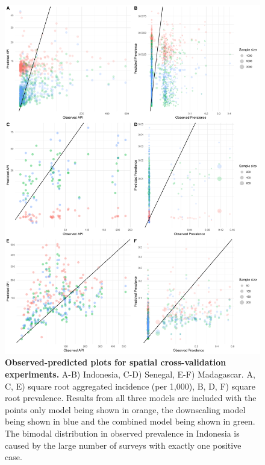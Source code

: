 \documentclass[10pt,letterpaper]{article}
\begin{document}
\begin{figure}
\includegraphics[width = 1.05\textwidth]{figures/spatial_cv_scatter} %
\caption{{\bf Observed-predicted plots for spatial cross-validation experiments.}
A-B) Indonesia, C-D) Senegal, E-F) Madagascar. A, C, E) square root aggregated incidence (per 1,000), B, D, F) square root prevalence.
Results from all three models are included with the points only model being shown in orange, the downscaling model being shown in blue and the combined model being shown in green.
The bimodal distribution in observed prevalence in Indonesia is caused by the large number of surveys with exactly one positive case.
}
\label{spatialpredobsscatter}
\end{figure}
\end{document}
